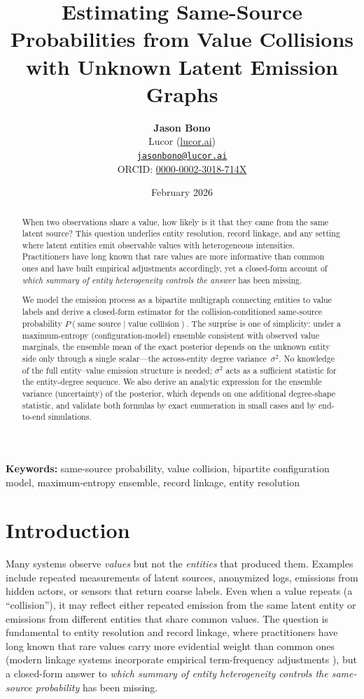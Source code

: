 \documentclass[11pt]{article}
\title{\vspace{-0.6em}
Estimating Same-Source Probabilities from Value Collisions\\
with Unknown Latent Emission Graphs
\vspace{-0.3em}}
\author{%
\textbf{Jason Bono}\\
Lucor (\url{lucor.ai})\\
\href{mailto:jasonbono@lucor.ai}{\texttt{jasonbono@lucor.ai}}\\[2pt]
{\small ORCID: \href{https://orcid.org/0000-0002-3018-714X}{0000-0002-3018-714X}}
\vspace{-0.3em}
}
\date{\vspace{-0.3em}February 2026\vspace{-0.6em}}
\newcommand{\1}{\mathbf{1}}
\theoremstyle{plain}
\theoremstyle{definition}
\begin{document}
\maketitle

\begin{abstract}
When two observations share a value, how likely is it that they came from the same latent source?
This question underlies entity resolution, record linkage, and any setting where latent entities emit observable values with heterogeneous intensities.
Practitioners have long known that rare values are more informative than common ones and have built empirical adjustments accordingly, yet a closed-form account of \emph{which summary of entity heterogeneity controls the answer} has been missing.

We model the emission process as a bipartite multigraph connecting entities to value labels and derive a closed-form estimator for the collision-conditioned same-source probability $P(\text{same source}\mid\text{value collision})$.
The surprise is one of simplicity: under a maximum-entropy (configuration-model) ensemble consistent with observed value marginals, the ensemble mean of the exact posterior depends on the unknown entity side only through a single scalar---the across-entity degree variance~$\sigma^2$.
No knowledge of the full entity--value emission structure is needed; $\sigma^2$ acts as a sufficient statistic for the entity-degree sequence.
We also derive an analytic expression for the ensemble variance (uncertainty) of the posterior, which depends on one additional degree-shape statistic, and validate both formulas by exact enumeration in small cases and by end-to-end simulations.
\end{abstract}

\medskip
\noindent\textbf{Keywords:} same-source probability, value collision, bipartite configuration model, maximum-entropy ensemble, record linkage, entity resolution

\vspace{0.2em}

\section{Introduction}
Many systems observe \emph{values} but not the \emph{entities} that produced them.
Examples include repeated measurements of latent sources, anonymized logs, emissions from hidden actors, or sensors that return coarse labels.
Even when a value repeats (a ``collision''), it may reflect either repeated emission from the same latent entity or emissions from different entities that share common values.
The question is fundamental to entity resolution and record linkage, where practitioners have long known that rare values carry more evidential weight than common ones (modern linkage systems incorporate empirical term-frequency adjustments \cite{winkler1989b}), but a closed-form answer to \emph{which summary of entity heterogeneity controls the same-source probability} has been missing.
\end{document}
